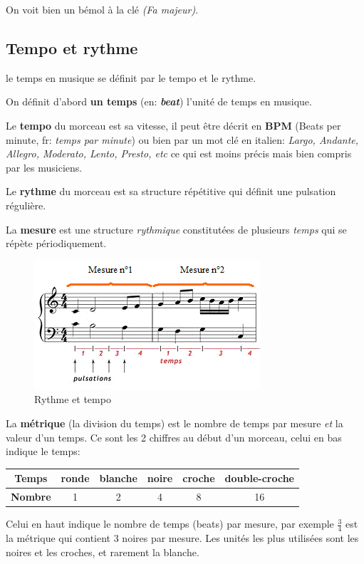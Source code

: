 \documentclass[french,]{article}
\begin{document}
On voit bien un bémol à la clé \emph{(Fa majeur)}.

\hypertarget{tempo-et-rythme}{%
\subsection{Tempo et rythme}\label{tempo-et-rythme}}

le temps en musique se définit par le tempo et le rythme.

On définit d'abord \textbf{un temps} (en: \textbf{\emph{beat}}) l'unité
de temps en musique.

Le \textbf{tempo} du morceau est sa vitesse, il peut être décrit en
\textbf{BPM} (Beats per minute, fr: \emph{temps par minute}) ou bien par
un mot clé en italien: \emph{Largo, Andante, Allegro, Moderato, Lento,
Presto, etc} ce qui est moins précis mais bien compris par les
musiciens.

Le \textbf{rythme} du morceau est sa structure répétitive qui définit
une pulsation régulière.

La \textbf{mesure} est une structure \emph{rythmique} constitutées de
plusieurs \emph{temps} qui se répète périodiquement.

\begin{figure}
\centering
\includegraphics{img/rythme.png}
\caption{Rythme et tempo}
\end{figure}

La \textbf{métrique} (la division du temps) est le nombre de temps par
mesure \emph{et} la valeur d'un temps. Ce sont les 2 chiffres au début
d'un morceau, celui en bas indique le temps:

\begin{longtable}[]{@{}cccccc@{}}
\toprule
\textbf{Temps} & ronde & blanche & noire & croche &
double-croche\tabularnewline
\midrule
\endhead
\textbf{Nombre} & 1 & 2 & 4 & 8 & 16\tabularnewline
\bottomrule
\end{longtable}

Celui en haut indique le nombre de temps (beats) par mesure, par exemple
\(\frac{3}{4}\) est la métrique qui contient 3 noires par mesure. Les
unités les plus utilisées sont les noires et les croches, et rarement la
blanche.
\end{document}
